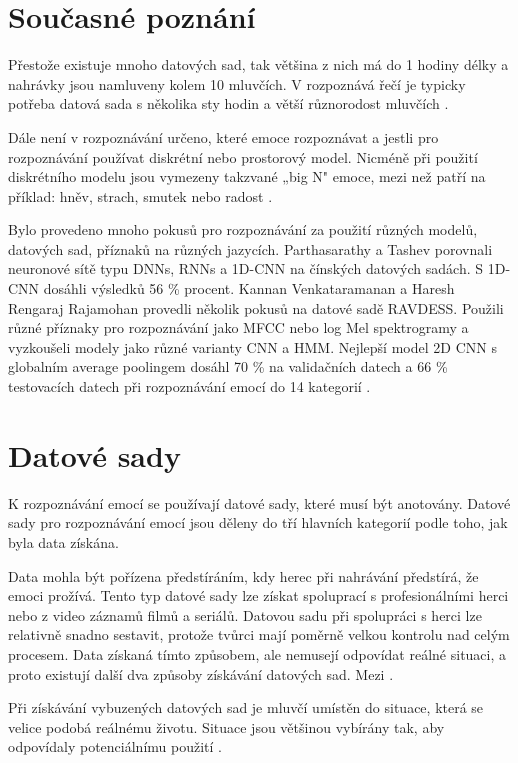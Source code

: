 \documentclass[FM,BP]{tulthesis}
\begin{document}
\section{Současné poznání}
Přestože existuje mnoho datových sad, tak většina z nich má do 1 hodiny délky a nahrávky jsou namluveny kolem 10 mluvčích. V rozpoznává řečí je typicky potřeba datová sada s několika sty hodin a větší různorodost mluvčích \cite{konar_chakraborty_2015}.

Dále není v rozpoznávání určeno, které emoce rozpoznávat a jestli pro rozpoznávání používat diskrétní nebo prostorový model. Nicméně při použití diskrétního modelu jsou vymezeny takzvané „big N" emoce, mezi než patří na příklad: hněv, strach, smutek nebo radost \cite{konar_chakraborty_2015}.

Bylo provedeno mnoho pokusů pro rozpoznávání za použití různých modelů, datových sad, příznaků na různých jazycích. Parthasarathy a
Tashev porovnali neuronové sítě typu DNNs, RNNs a 1D-CNN na čínských datových sadách. S 1D-CNN dosáhli výsledků 56 \% procent. Kannan Venkataramanan a Haresh Rengaraj Rajamohan provedli několik pokusů na datové sadě RAVDESS. Použili různé příznaky pro rozpoznávání jako MFCC nebo log Mel spektrogramy a vyzkoušeli modely jako různé varianty CNN a HMM. Nejlepší model 2D CNN s globalním average poolingem dosáhl 70 \% na validačních datech a 66 \% testovacích datech při rozpoznávání emocí do 14 kategorií \cite{DBLP:journals/corr/abs-1912-10458}.

\section{Datové sady}
K rozpoznávání emocí se používají datové sady, které musí být anotovány. Datové sady pro rozpoznávání emocí jsou děleny do tří hlavních kategorií podle toho, jak byla data získána.

Data mohla být pořízena předstíráním, kdy herec při nahrávání předstírá, že emoci prožívá. Tento typ datové sady lze získat spoluprací s profesionálními herci nebo z video záznamů filmů a seriálů. Datovou sadu při spolupráci s herci lze relativně snadno sestavit, protože tvůrci mají poměrně velkou kontrolu nad celým procesem. Data získaná tímto způsobem, ale nemusejí odpovídat reálné situaci, a proto existují další dva způsoby získávání datových sad. Mezi  \cite{konar_chakraborty_2015}.

Při získávání vybuzených datových sad je mluvčí umístěn do situace, která se velice podobá reálnému životu. Situace jsou většinou vybírány tak, aby odpovídaly potenciálnímu použití \cite{konar_chakraborty_2015}.
\end{document}
